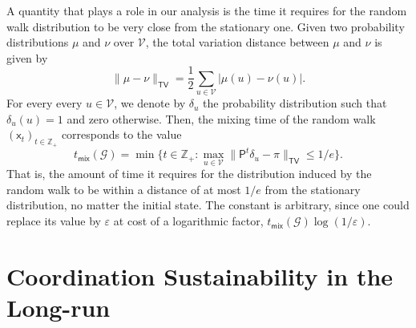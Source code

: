 \documentclass[letterpaper,11pt]{article}
\newcommand{\ZZ}{\mathbb{Z}}
\newcommand{\tv}{\mathsf{TV}}
\newcommand{\tmix}{t_{\mathsf{mix}}}
\newcommand{\psf}{\mathsf{P}}
\newcommand{\xsf}{\mathsf{x}}
\begin{document}
 A quantity that plays a role in our analysis is the time it requires for the random walk distribution to be very close from the stationary one.
Given two probability distributions $\mu$ and $\nu$ over $\mathcal{V}$, the total variation distance between $\mu$ and $\nu$ is given by
\begin{equation*}
\|\mu-\nu\|_{\tv}=\frac{1}{2}\sum_{u\in \mathcal{V}}|\mu(u)-\nu(u)|.
\end{equation*}
For every every $u\in \mathcal{V}$, we denote by $\delta_u$ the probability distribution such that $\delta_u(u)=1$ and zero otherwise. 
Then, the mixing time of the random walk $(\xsf_t)_{t\in \ZZ_+}$ corresponds to the value
\begin{equation*}
\tmix(\mathcal{G})=\min\Big\{t\in \ZZ_+:\max_{u\in \mathcal{V}}\|\psf^t\delta_u-\pi\|_{\tv}\le 1/e\Big\}.
\end{equation*}
That is, the amount of time it requires for the distribution induced by the random walk to be within a distance of at most $1/e$ from the stationary distribution, no matter the initial state.
The constant is arbitrary, since one could replace its value by $\varepsilon$ at cost of a logarithmic factor, $\tmix(\mathcal{G})\log(1/\varepsilon)$.

\section{Coordination Sustainability in the Long-run}
\end{document}

